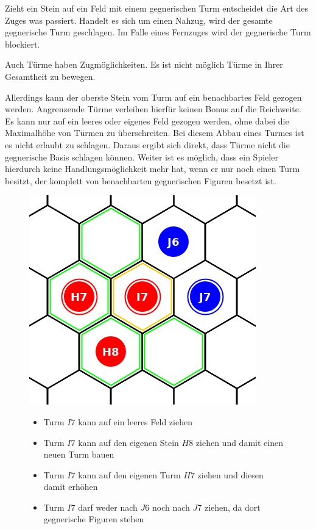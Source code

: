 Zieht ein Stein auf ein Feld mit einem gegnerischen Turm entscheidet die Art des Zuges was passiert. Handelt es sich um einen Nahzug, wird der gesamte gegnerische Turm geschlagen. Im Falle eines Fernzuges wird der gegnerische Turm blockiert.

Auch Türme haben Zugmöglichkeiten. Es ist nicht möglich Türme in Ihrer Gesamtheit zu bewegen. 

Allerdings kann der oberste Stein vom Turm auf ein benachbartes Feld gezogen werden. Angrenzende Türme verleihen hierfür keinen Bonus auf die Reichweite. Es kann nur auf ein leeres oder eigenes Feld gezogen werden, ohne dabei die Maximalhöhe von Türmen zu überschreiten.
\newpage 
Bei diesem Abbau eines Turmes ist es nicht erlaubt zu schlagen. Daraus ergibt sich direkt, dass Türme nicht die gegnerische Basis schlagen können. Weiter ist es möglich, dass ein Spieler hierdurch keine Handlungsmöglichkeit mehr hat, wenn er nur noch einen Turm besitzt, der komplett von benachbarten gegnerischen Figuren besetzt ist. 

\begin{figure}[ht]
\begin{center}
\includegraphics[scale=0.25]{graphic/tower-move.png}
\end{center}
\begin{itemize}
\item Turm $I7$ kann auf ein leeres Feld ziehen
\item Turm $I7$ kann auf den eigenen Stein $H8$ ziehen und damit einen neuen Turm bauen
\item Turm $I7$ kann auf den eigenen Turm $H7$ ziehen und diesen damit erhöhen
\item Turm $I7$ darf weder nach $J6$ noch nach $J7$ ziehen, da dort gegnerische Figuren stehen
\end{itemize}
\end{figure}


